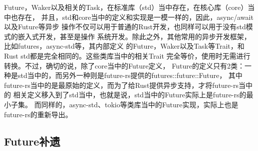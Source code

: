 \begin{note}
Future，Waker以及相关的Task，在标准库（std）当中存在，在核心库（core）当中也存在，
并且，std和core当中的定义和实现是一模一样的，因此，async/await以及Future等异步
操作不仅可以用于普通的Rust开发，也同样可以用于没有std模式的嵌入式开发，甚至是操作
系统开发。除此之外，其他常用的异步开发框架，比如futures，async-std等，其内部定义
的Future，Waker以及Task等Trait，和Rust std都是完全相同的。这些类库当中的相关Trait
完全等价，使用时无需进行转换。不过，确切的说，除了core当中的Future定义，
Future的定义只有2类：一种是std当中的，而另外一种则是future-rs提供的futures::future::Future，
其中future-rs当中的是最原始的定义，而为了给Rust提供异步支持，才将future-rs当中的
相关定义移入到了std当中，也就是说，std当中的Future实际上是future-rs的最小子集。
而同样的，async-std、tokio等类库当中的Future实现，实际上也是future-rs的重新导出。
\end{note}
\subsection{Future补遗}
